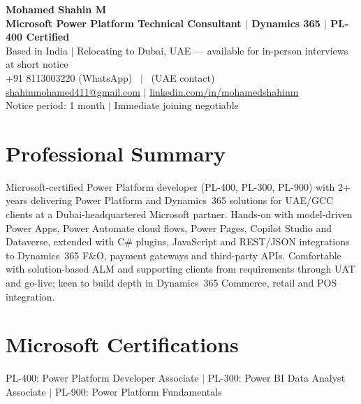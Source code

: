\documentclass[10pt,a4paper]{article}
\def\DubaiContact{}
\begin{document}
\begin{center}
  {\LARGE\bfseries Mohamed Shahin M}\\[3pt]
  {\normalsize\bfseries Microsoft Power Platform Technical Consultant $\mid$ Dynamics 365 $\mid$ PL-400 Certified}\\[4pt]
  Based in India $\mid$ Relocating to Dubai, UAE --- available for in-person interviews at short notice\\[3pt]
  +91 8113003220 (WhatsApp)%
  \ifx\DubaiContact\empty\else\ $\mid$ \DubaiContact\ (UAE contact)\fi\\[3pt]
  \href{mailto:shahinmohamed411@gmail.com}{shahinmohamed411@gmail.com}
  $\mid$ \href{https://www.linkedin.com/in/mohamedshahinm}{linkedin.com/in/mohamedshahinm}\\[3pt]
  Notice period: 1 month $\mid$ Immediate joining negotiable
\end{center}
\vspace{-6pt}

\section*{Professional Summary}
Microsoft-certified Power Platform developer (PL-400, PL-300, PL-900) with 2+ years delivering Power Platform and Dynamics~365 solutions for UAE/GCC clients at a Dubai-headquartered Microsoft partner. Hands-on with model-driven Power Apps, Power Automate cloud flows, Power Pages, Copilot Studio and Dataverse, extended with C\# plugins, JavaScript and REST/JSON integrations to Dynamics~365 F\&O, payment gateways and third-party APIs. Comfortable with solution-based ALM and supporting clients from requirements through UAT and go-live; keen to build depth in Dynamics~365 Commerce, retail and POS integration.

\section*{Microsoft Certifications}
{\small PL-400: Power Platform Developer Associate $\mid$ PL-300: Power BI Data Analyst Associate $\mid$ PL-900: Power Platform Fundamentals\par}
\end{document}
